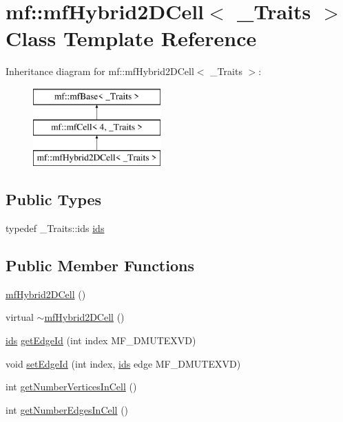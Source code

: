 \hypertarget{classmf_1_1mfHybrid2DCell}{
\section{mf::mfHybrid2DCell$<$ \_\-Traits $>$ Class Template Reference}
\label{classmf_1_1mfHybrid2DCell}
}
Inheritance diagram for mf::mfHybrid2DCell$<$ \_\-Traits $>$:\begin{figure}[H]
\begin{center}
\leavevmode
\includegraphics[height=3.000000cm]{classmf_1_1mfHybrid2DCell}
\end{center}
\end{figure}
\subsection*{Public Types}
\begin{DoxyCompactItemize}
\item 
typedef \_\-Traits::ids \hyperlink{classmf_1_1mfHybrid2DCell_a0ee11399531818ab7eac9c5fede19b14}{ids}
\end{DoxyCompactItemize}
\subsection*{Public Member Functions}
\begin{DoxyCompactItemize}
\item 
\hyperlink{classmf_1_1mfHybrid2DCell_a1a8a1a4894a226cd4da0c92ae9e5a41c}{mfHybrid2DCell} ()
\item 
virtual \hyperlink{classmf_1_1mfHybrid2DCell_a83536a3046f0a70ac10cf879b4c8ffe0}{$\sim$mfHybrid2DCell} ()
\item 
\hyperlink{classmf_1_1mfBase_a3b23f16ddf59da0a91ab12cf57c1f111}{ids} \hyperlink{classmf_1_1mfHybrid2DCell_a6c1d59c23b1e25b59196220d3af3a4ef}{getEdgeId} (int index MF\_\-DMUTEXVD)
\item 
void \hyperlink{classmf_1_1mfHybrid2DCell_acf7eaf0c9e4c50f0ac1bb06ca2010250}{setEdgeId} (int index, \hyperlink{classmf_1_1mfBase_a3b23f16ddf59da0a91ab12cf57c1f111}{ids} edge MF\_\-DMUTEXVD)
\item 
int \hyperlink{classmf_1_1mfHybrid2DCell_a0d49a5d889459f5100357c45d192d179}{getNumberVerticesInCell} ()
\item 
int \hyperlink{classmf_1_1mfHybrid2DCell_a717323295b1a993d0c9d029978c84743}{getNumberEdgesInCell} ()
\end{DoxyCompactItemize}
